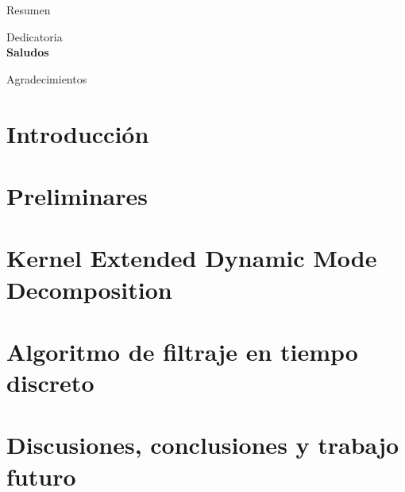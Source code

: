 \documentclass[
	spanish, %
	letterpaper, oneside
]{book}
\begin{document}
\templatePortrait

\templatePagecfg

\begin{abstractd}
	Resumen
\end{abstractd}

\begin{dedicatory}
	Dedicatoria \\
	\textbf{Saludos}
\end{dedicatory}

\begin{acknowledgments}
	Agradecimientos
\end{acknowledgments}

\templateIndex

\templateFinalcfg


\chapter{Introducción}


\chapter{Preliminares}


\chapter{Kernel Extended Dynamic Mode Decomposition}


\chapter{Algoritmo de filtraje en tiempo discreto}


% 

\chapter{Discusiones, conclusiones y trabajo futuro}


\begin{appendixd}
    
\end{appendixd}





\end{document}
